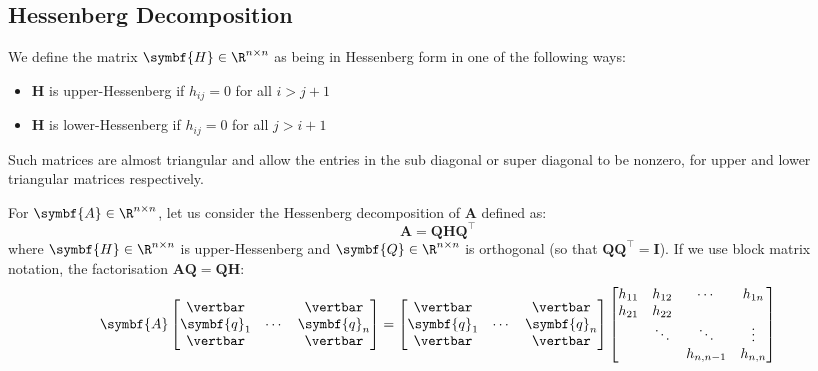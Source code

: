 \documentclass{article}
\begin{document}
\subsection{Hessenberg Decomposition}
\begin{definition}
    We define the matrix \(\symbf{H} \in \R^{n \times n}\) as being in
    Hessenberg form in one of the following ways:
    \begin{itemize}
        \item \(\symbf{H}\) is upper-Hessenberg if \(h_{ij} = 0\) for all \(i > j + 1\)
        \item \(\symbf{H}\) is lower-Hessenberg if \(h_{ij} = 0\) for all \(j > i + 1\)
    \end{itemize}
    Such matrices are almost triangular and allow the entries in the sub
    diagonal or super diagonal to be nonzero, for upper and lower
    triangular matrices respectively.
\end{definition}
For \(\symbf{A} \in \R^{n \times n}\), let us consider the Hessenberg
decomposition of \(\symbf{A}\) defined as:
\begin{equation*}
    \symbf{A} = \symbf{Q} \symbf{H} \symbf{Q}^\top
\end{equation*}
where \(\symbf{H} \in \R^{n \times n}\) is upper-Hessenberg and
\(\symbf{Q} \in \R^{n \times n}\) is orthogonal (so that \(\symbf{Q} \symbf{Q}^\top = \symbf{I}\)).
If we use block matrix notation, the factorisation \(\symbf{A} \symbf{Q} = \symbf{Q} \symbf{H}\):
\begin{equation*}
    \symbf{A}
    \begin{bmatrix}
        \vertbar    &        & \vertbar    \\
        \symbf{q}_1 & \cdots & \symbf{q}_n \\
        \vertbar    &        & \vertbar    \\
    \end{bmatrix}
    =
    \begin{bmatrix}
        \vertbar    &        & \vertbar    \\
        \symbf{q}_1 & \cdots & \symbf{q}_n \\
        \vertbar    &        & \vertbar    \\
    \end{bmatrix}
    \begin{bmatrix}
        h_{11} & h_{12} & \cdots    & h_{1n}  \\
        h_{21} & h_{22} &           &         \\
               & \ddots & \ddots    & \vdots  \\
               &        & h_{n,n-1} & h_{n,n} \\
    \end{bmatrix}
\end{equation*}
\end{document}

